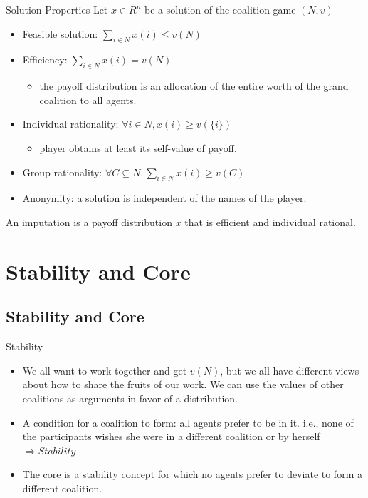 \documentclass{beamer}
\begin{document}
\begin{frame}{Solution Properties}
    Let $x \in R^n$ be a solution of the coalition game $(N,v)$
    \begin{itemize}
        \item {\color{blue} Feasible solution:} $\sum_{i \in N} x(i) \leq v(N)$
        \item {\color{blue} Efficiency:} $\sum_{i \in N} x(i) = v(N)$
        \begin{itemize}
            \item the payoff distribution is an allocation of the entire worth of the grand coalition to all agents.
        \end{itemize}
        \item {\color{blue} Individual rationality:} $\forall i \in N, x(i) \geq v(\{i\})$
        \begin{itemize}
            \item player obtains at least its self-value of payoff.
        \end{itemize}
        \item {\color{blue} Group rationality:} $\forall C \subseteq N, \sum_{i \in N} x(i) \geq v(C)$
        \item {\color{blue} Anonymity:} a solution is independent of the names of the player.
    \end{itemize}

    \vspace{0.2cm}

    An {\color{blue} imputation} is a payoff distribution $x$ that is efficient and individual rational.

\end{frame}
\section{Stability and Core}
\subsection{Stability and Core}
\begin{frame}{Stability}
    \begin{itemize}
        \item We all want to work together and get $v(N)$, but we all have different views about how to share the fruits of our work. We can use the values of other coalitions as arguments in favor of a distribution.
        \item A condition for a coalition to form:
            {\color{blue}all} agents prefer to be in it. i.e., none of the participants wishes she were in a different coalition or by herself {\color{blue} $\Rightarrow Stability$ }
        \item The {\color{blue} core} is a stability concept for which no agents prefer to deviate to form a different coalition.
    \end{itemize}
\end{frame}
\end{document}
